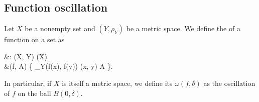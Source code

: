 \subsection{Function oscillation}\label{subsec:function_oscillation}

\begin{definition}\label{def:function_oscillation}
  Let \( X \) be a nonempty set and \( (Y, \rho_{Y}) \) be a metric space. We define the  of a function on a set as
  \begin{balign*}
     &\omega: \fun(X, Y) \times \pow(X) \to [0, \infty] \\
     &\omega(f, A) \coloneqq \sup \Big\{ \rho_{Y}(f(x), f(y)) \colon (x, y) \in A \Big\}.
  \end{balign*}

  In particular, if \( X \) is itself a metric space, we define its  \( \omega(f, \delta) \) as the oscillation of \( f \) on the ball \( B(0, \delta) \).
\end{definition}


